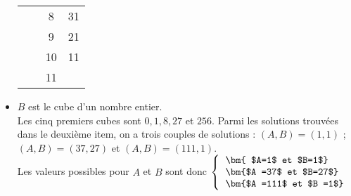 \begin{itemize}
\begin{tabular}{|C{0.8}|c|C{0.8}|C{0.8}|}
      & & 8 & 31 \\
      & & 9 & 21 \\
      & & 10 & 11 \\
      & & 11 &  \\
      \hline
   \end{tabular}
   \bigskip
   \item $B$ est le cube d'un nombre entier. \\
   Les cinq premiers cubes sont $0, 1, 8, 27$ et $256$. Parmi les solutions trouvées dans le deuxième item, on a trois couples de solutions : $(A,B) =(1,1)$ \quad ; \quad $(A,B) =(37,27)$ \quad et \quad $(A,B) =(111,1)$. \\
   Les valeurs possibles pour  $A$ et $B$ sont donc $\left\{\begin{tabular}{l}
  \bm{ $A=1$ et $B=1$} \\ \bm{$A =37$ et $B=27$} \\ \bm{$A =111$ et $B =1$}  \\
   \end{tabular}\right.$
\end{itemize}
